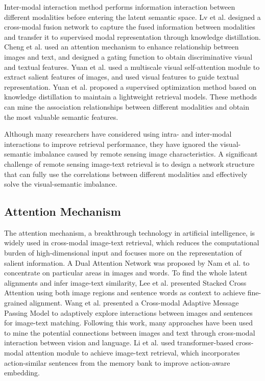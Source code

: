 \documentclass[journal]{IEEEtran}
\begin{document}
Inter-modal interaction method \cite{lv2021fusion, cheng2021deep, yuan2022exploring, yuan2021lightweight} performs information interaction between different modalities before entering the latent semantic space. Lv et al. \cite{lv2021fusion} designed a cross-modal fusion network to capture the fused information between modalities and transfer it to supervised modal representation through knowledge distillation. Cheng et al. \cite{cheng2021deep} used an attention mechanism to enhance relationship between images and text, and designed a gating function to obtain discriminative visual and textual features. Yuan et al. \cite{yuan2022exploring} used a multiscale visual self-attention module to extract salient features of images, and used visual features to guide textual representation. Yuan et al. \cite{yuan2021lightweight} proposed a supervised optimization method based on knowledge distillation to maintain a lightweight retrieval models. These methods can mine the association relationships between different modalities and obtain the most valuable semantic features.

Although many researchers have considered using intra- and inter-modal interactions to improve retrieval performance, they have ignored the visual-semantic imbalance caused by remote sensing image characteristics. A significant challenge of remote sensing image-text retrieval is to design a network structure that can fully use the correlations between different modalities and effectively solve the visual-semantic imbalance.
\subsection{Attention Mechanism}
The attention mechanism, a breakthrough technology in artificial intelligence, is widely used in cross-modal image-text retrieval, which reduces the computational burden of high-dimensional input and focuses more on the representation of salient information. A Dual Attention Network was proposed by Nam et al. \cite{nam2017dual} to concentrate on particular areas in images and words. To find the whole latent alignments and infer image-text similarity, Lee et al. \cite{lee2018stacked} presented Stacked Cross Attention using both image regions and sentence words as context to achieve fine-grained alignment. Wang et al. \cite{wang2019camp} presented a Cross-modal Adaptive Message Passing Model to adaptively explore interactions between images and sentences for image-text matching. Following this work, many approaches \cite{ji2019saliency, zhang2020context, wei2020multi, ji2021step} have been used to mine the potential connections between images and text through cross-modal interaction between vision and language. Li et al. \cite{li2022action} used transformer-based cross-modal attention module to achieve image-text retrieval, which incorporates action-similar sentences from the memory bank to improve action-aware embedding.
\end{document}
